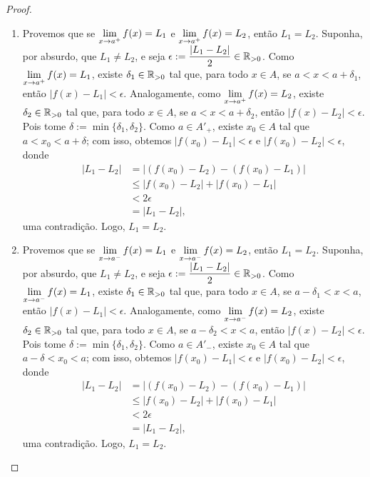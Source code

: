 \begin{proof}
    \leavevmode
        \begin{enumerate}[leftmargin=*, align=left, label=\textbf{(\alph*)}]
            \item Provemos que se $\displaystyle \lim_{x \to a^+} f(x) = L_1$ e $\displaystyle \lim_{x \to a^+} f(x) = L_2$, então $L_1 = L_2$. Suponha, por absurdo, que $L_1 \neq L_2$, e seja $\epsilon := \dfrac{|L_1 - L_2|}{2} \in \mathbb{R}_{>0}$. Como $\displaystyle \lim_{x \to a^+} f(x) = L_1$, existe $\delta_1 \in \mathbb{R}_{>0}$ tal que, para todo $x \in A$, se $a < x < a+\delta_1$, então $|f(x) - L_1| < \epsilon$. Analogamente, como $\displaystyle \lim_{x \to a^+} f(x) = L_2$, existe $\delta_2 \in \mathbb{R}_{>0}$ tal que, para todo $x \in A$, se $a < x < a+\delta_2$, então $|f(x) - L_2| < \epsilon$. Pois tome $\delta := \min \{\delta_1, \delta_2\}$. Como $a \in A'_+$, existe $x_0 \in A$ tal que $a < x_0 < a+\delta$; com isso, obtemos $|f(x_0) - L_1| < \epsilon$ e $|f(x_0) - L_2| < \epsilon$, donde
                \begin{align*}
                    |L_1 - L_2| &= |(f(x_0) - L_2) - (f(x_0)-L_1)| \\
                    &\leq |f(x_0) - L_2| + |f(x_0)-L_1| \\
                    &< 2\epsilon \\
                    &= |L_1 - L_2|,
                \end{align*}
            uma contradição. Logo, $L_1 = L_2$. \blackproof
            \item Provemos que se $\displaystyle \lim_{x \to a^-} f(x) = L_1$ e $\displaystyle \lim_{x \to a^-} f(x) = L_2$, então $L_1 = L_2$. Suponha, por absurdo, que $L_1 \neq L_2$, e seja $\epsilon := \dfrac{|L_1 - L_2|}{2} \in \mathbb{R}_{>0}$. Como $\displaystyle \lim_{x \to a^-} f(x) = L_1$, existe $\delta_1 \in \mathbb{R}_{>0}$ tal que, para todo $x \in A$, se $a-\delta_1 < x < a$, então $|f(x) - L_1| < \epsilon$. Analogamente, como $\displaystyle \lim_{x \to a^-} f(x) = L_2$, existe $\delta_2 \in \mathbb{R}_{>0}$ tal que, para todo $x \in A$, se $a-\delta_2 < x < a$, então $|f(x) - L_2| < \epsilon$. Pois tome $\delta := \min \{\delta_1, \delta_2\}$. Como $a \in A'_-$, existe $x_0 \in A$ tal que $a-\delta < x_0 < a$; com isso, obtemos $|f(x_0) - L_1| < \epsilon$ e $|f(x_0) - L_2| < \epsilon$, donde
                \begin{align*}
                    |L_1 - L_2| &= |(f(x_0) - L_2) - (f(x_0)-L_1)| \\
                    &\leq |f(x_0) - L_2| + |f(x_0)-L_1| \\
                    &< 2\epsilon \\
                    &= |L_1 - L_2|,
                \end{align*}
            uma contradição. Logo, $L_1 = L_2$. \blackproof
        \end{enumerate}
\end{proof}

